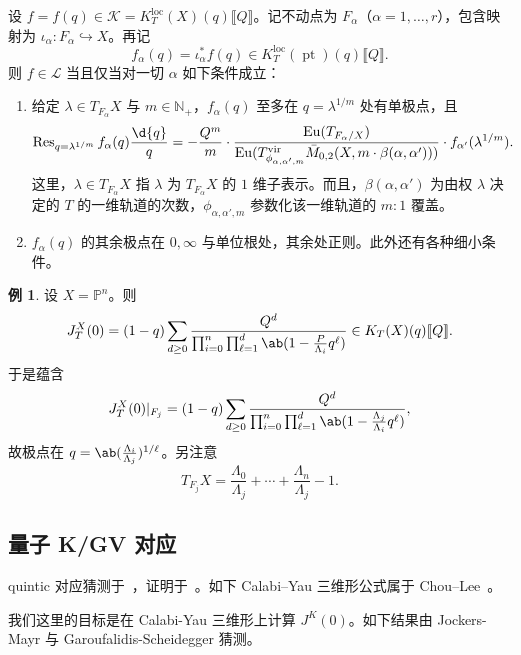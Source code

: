 \documentclass{amsart}
\theoremstyle{definition}
\newtheorem{exm}[thm]{例}
\theoremstyle{remark}
\theoremstyle{plain}
\theoremstyle{definition}
\theoremstyle{remark}
\newcommand{\N}{\mathbb{N}}
\renewcommand{\P}{\mathbb{P}}
\newcommand{\mc}[1]{\mathcal{#1}}
\newcommand{\mr}[1]{\mathrm{#1}}
\newcommand{\on}[1]{\operatorname{#1}}
\newcommand{\1}{\mathbf{1}}
\newcommand{\2}{\mathbf{2}}
\newcommand{\3}{\mathbf{3}}
\newcommand{\vir}{\mr{vir}}
\newcommand{\ps}[1]{\llbracket #1 \rrbracket}
\newcommand{\loc}{\mr{loc}}
\begin{document}
设 \(f = f(q) \in \mc{K} = K_T^{\loc}(X)(q)\ps{Q}\)。记不动点为 \(F_{\alpha}\)（\(\alpha = 1, \ldots, r\)），包含映射为 \(\iota_{\alpha} \colon F_{\alpha} \hookrightarrow X\)。再记
\[ f_{\alpha}(q) = \iota_{\alpha}^* f(q) \in K_T^{\loc}(\on{pt})(q)\ps{Q}. \]
则 \(f \in \mc{L}\) 当且仅当对一切 \(\alpha\) 如下条件成立：
\begin{enumerate}
    \item 给定 \(\lambda \in T_{F_{\alpha}} X\) 与 \(m \in \N_+\)，\(f_{\alpha}(q)\) 至多在 \(q = \lambda^{1/m}\) 处有单极点，且
        \[ \on{Res}_{q = \lambda^{1/m}} f_{\alpha}(q) \frac{\d{q}}{q} = -\frac{Q^m}{m} \cdot \frac{\on{Eu}(T_{F_{\alpha}/X})}{\on{Eu}(T^{\vir}_{\phi_{\alpha,\alpha',m}}\bar{M}_{0,2}(X, m \cdot \beta(\alpha, \alpha')))} \cdot f_{\alpha'}(\lambda^{1/m}). \]
        这里，\(\lambda \in T_{F_{\alpha}}X\) 指 \(\lambda\) 为 \(T_{F_{\alpha}} X\) 的 \(1\) 维子表示。而且，\(\beta(\alpha,\alpha')\) 为由权 \(\lambda\) 决定的 \(T\) 的一维轨道的次数，\(\phi_{\alpha, \alpha', m}\) 参数化该一维轨道的 \(m:1\) 覆盖。
    \item \(f_{\alpha}(q)\) 的其余极点在 \(0, \infty\) 与单位根处，其余处正则。此外还有各种细小条件。
\end{enumerate}

\begin{exm}
    设 \(X = \P^n\)。则
    \[ J_T^X(0) = (1-q) \sum_{d \geq 0} \frac{Q^d}{\prod_{i=0}^n \prod_{\ell = 1}^d \ab(1 - \frac{P}{\Lambda_i} q^{\ell})} \in K_T(X)(q) \ps{Q}. \]
    于是蕴含
    \[ J_T^X(0) |_{F_j} = (1-q) \sum_{d \geq 0} \frac{Q^d}{\prod_{i=0}^n \prod_{\ell = 1}^d \ab(1 - \frac{\Lambda_j}{\Lambda_i}q^{\ell})}, \]
    故极点在 \(q = \ab(\frac{\Lambda_i}{\Lambda_j})^{1/\ell}\)。另注意
    \[ T_{F_j} X = \frac{\Lambda_0}{\Lambda_j} + \cdots + \frac{\Lambda_n}{\Lambda_j} - 1. \]
\end{exm}

\subsection{量子 K/GV 对应}%
\label{sub:Quantum K/GV correspondence}

quintic 对应猜测于~\cite{GaroufalidisScheidegger2022}，证明于~\cite{ChouLeeQuintic}。如下 Calabi--Yau 三维形公式属于 Chou--Lee~\cite{ChouLee2025}。

我们这里的目标是在 Calabi-Yau 三维形上计算 \(J^K(0)\)。如下结果由 Jockers-Mayr 与 Garoufalidis-Scheidegger 猜测。
\end{document}
